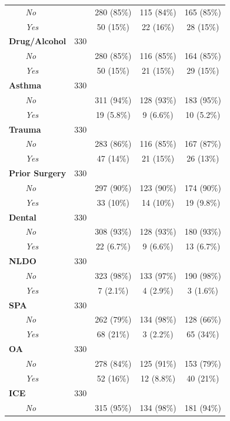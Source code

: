 \documentclass[
]{article}
\begin{document}
\begin{table}[t]
\begin{tabular*}{0.7\linewidth}{@{\extracolsep{\fill}}lcccc}
{\itshape     No} &  & 280 (85\%) & 115 (84\%) & 165 (85\%) \\ 
{\itshape     Yes} &  & 50 (15\%) & 22 (16\%) & 28 (15\%) \\ 
{\bfseries Drug/Alcohol} & 330 &  &  &  \\ 
{\itshape     No} &  & 280 (85\%) & 116 (85\%) & 164 (85\%) \\ 
{\itshape     Yes} &  & 50 (15\%) & 21 (15\%) & 29 (15\%) \\ 
{\bfseries Asthma} & 330 &  &  &  \\ 
{\itshape     No} &  & 311 (94\%) & 128 (93\%) & 183 (95\%) \\ 
{\itshape     Yes} &  & 19 (5.8\%) & 9 (6.6\%) & 10 (5.2\%) \\ 
{\bfseries Trauma} & 330 &  &  &  \\ 
{\itshape     No} &  & 283 (86\%) & 116 (85\%) & 167 (87\%) \\ 
{\itshape     Yes} &  & 47 (14\%) & 21 (15\%) & 26 (13\%) \\ 
{\bfseries Prior Surgery} & 330 &  &  &  \\ 
{\itshape     No} &  & 297 (90\%) & 123 (90\%) & 174 (90\%) \\ 
{\itshape     Yes} &  & 33 (10\%) & 14 (10\%) & 19 (9.8\%) \\ 
{\bfseries Dental} & 330 &  &  &  \\ 
{\itshape     No} &  & 308 (93\%) & 128 (93\%) & 180 (93\%) \\ 
{\itshape     Yes} &  & 22 (6.7\%) & 9 (6.6\%) & 13 (6.7\%) \\ 
{\bfseries NLDO} & 330 &  &  &  \\ 
{\itshape     No} &  & 323 (98\%) & 133 (97\%) & 190 (98\%) \\ 
{\itshape     Yes} &  & 7 (2.1\%) & 4 (2.9\%) & 3 (1.6\%) \\ 
{\bfseries SPA} & 330 &  &  &  \\ 
{\itshape     No} &  & 262 (79\%) & 134 (98\%) & 128 (66\%) \\ 
{\itshape     Yes} &  & 68 (21\%) & 3 (2.2\%) & 65 (34\%) \\ 
{\bfseries OA} & 330 &  &  &  \\ 
{\itshape     No} &  & 278 (84\%) & 125 (91\%) & 153 (79\%) \\ 
{\itshape     Yes} &  & 52 (16\%) & 12 (8.8\%) & 40 (21\%) \\ 
{\bfseries ICE} & 330 &  &  &  \\ 
{\itshape     No} &  & 315 (95\%) & 134 (98\%) & 181 (94\%) \\ 

\end{tabular*}
\end{table}
\end{document}
